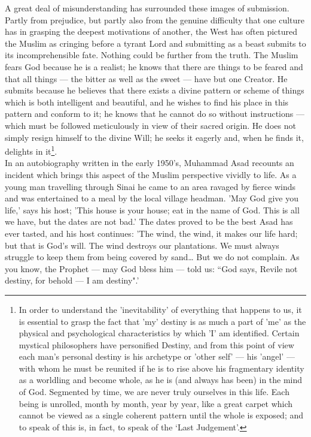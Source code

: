 \documentclass[10pt, twoside]{book}
\begin{document}
A great deal of misunderstanding has surrounded these images of submission. Partly from prejudice, 
but partly also from the genuine difficulty that one culture has in grasping the deepest motivations 
of another, the West has often pictured the Muslim as cringing before a tyrant Lord and submitting as 
a beast submits to its incomprehensible fate. Nothing could be further from the truth. The Muslim 
fears God because he is a realist; he knows that there are things to be feared and that all things --- 
the bitter as well as the sweet --- have but one Creator. He submits because he believes that there 
exists a divine pattern or scheme of things which is both intelligent and beautiful, and he wishes to 
find his place in this pattern and conform to it; he knows that he cannot do so without instructions 
--- which must be followed meticulously in view of their sacred origin. He does not simply resign 
himself to the divine Will; he seeks it eagerly and, when he finds it, delights in it\footnote{In order to understand the 'inevitability' of everything that happens to us, it is essential to grasp the fact that 'my' destiny is as much a part of 'me' as the physical and psychological characteristics by which 'I' am identified. Certain mystical philosophers have personified Destiny, and from this point of view each man's personal destiny is his archetype or 'other self' --- his 'angel' --- with whom he must be reunited if he is to rise above his fragmentary identity as a worldling and become whole, as he is (and always has been) in the mind of God. Segmented by time, we are never truly ourselves in this life. Each being is unrolled, month by month, year by year, like a great carpet which cannot be viewed as a single coherent pattern until the whole is exposed; and to speak of this is, in fact, to speak of the `Last Judgement'.}. \\


In an autobiography written in the early 1950's, Muhammad Asad recounts an incident which brings this 
aspect of the Muslim perspective vividly to life. As a young man travelling through Sinai he came to 
an area ravaged by fierce winds and was entertained to a meal by the local village headman. 'May God 
give you life,' says his host; 'This house is your house; eat in the name of God. This is all we 
have, but the dates are not bad.' The dates proved to be the best Asad has ever tasted, and his host 
continues: 'The wind, the wind, it makes our life hard; but that is God's will. The wind destroys our 
plantations. We must always struggle to keep them from being covered by sand\ldots{} But we do not 
complain. As you know, the Prophet --- may God bless him --- told us: ``God says, Revile not destiny, for 
behold --- I am destiny".' \\
\end{document}
